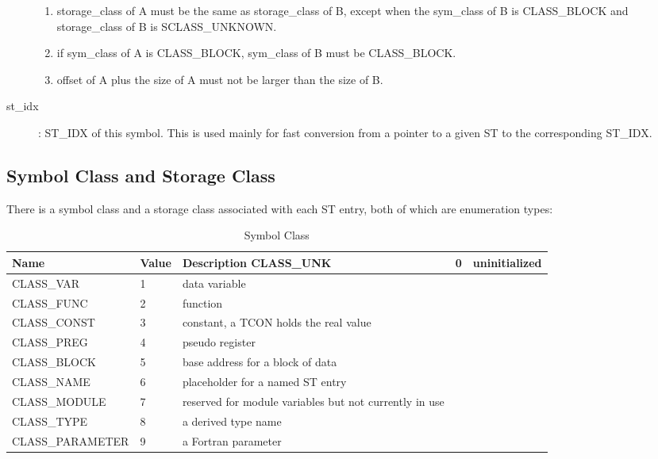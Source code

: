 \begin{description}
\begin{enumerate}
\item storage\_class of A must be the same as
storage\_class of B, except when the sym\_class of B is
%
CLASS\_BLOCK and storage\_class of B is SCLASS\_UNKNOWN.


\item if sym\_class of A is CLASS\_BLOCK, sym\_class of B must be CLASS\_BLOCK.

\item offset of A plus the size of A must not be larger than the size of
B.
\end{enumerate}

\item[st\_idx]:
%
ST\_IDX of this symbol.
This is used mainly for fast conversion from a pointer to a given
%
ST to the corresponding ST\_IDX.
\end{description}

\subsection{Symbol Class and Storage Class}

There is a symbol class and a storage class associated with each
%
ST
entry, both of which are enumeration types:

\begin{center}
\begin{longtable}{|p{1in}|p{.5in}|p{2.75in}|}
\caption{Symbol Class\label{sym-class}}\\
\hline
Name & Value & Description \endhead\hline\hline
{}%
CLASS\_UNK & 0 & uninitialized \\\hline
{}%
CLASS\_VAR & 1 & data variable \\\hline
{}%
CLASS\_FUNC & 2 & function \\\hline
{}%
CLASS\_CONST & 3 & constant, a
%
TCON holds the real value \\\hline
{}%
CLASS\_PREG & 4 & pseudo register \\\hline
{}%
CLASS\_BLOCK & 5 & base address for a block of data \\\hline
{}%
CLASS\_NAME & 6 & placeholder for a named
%
ST entry\\\hline
{}%
CLASS\_MODULE & 7 & reserved for module variables but not currently 
in use\\\hline
{}%
CLASS\_TYPE & 8 & a derived type name\\\hline
{}%
CLASS\_PARAMETER & 9 & a Fortran parameter\\\hline
\end{longtable}
\end{center}

